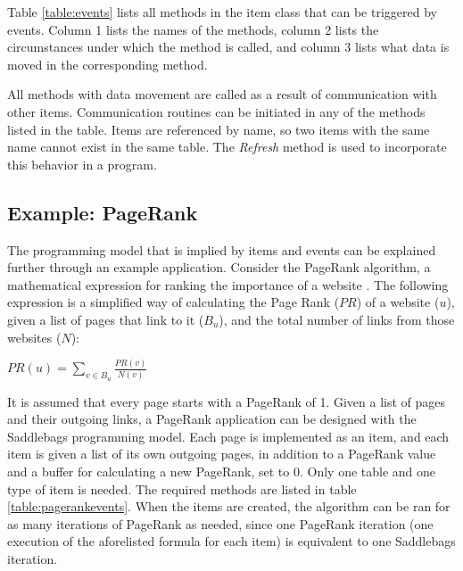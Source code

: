 \documentclass{uit-report}
\begin{document}
Table \ref{table:events} lists all methods in the item class that can be triggered by events. Column 1 lists the names of the methods, column 2 lists the circumstances under which the method is called, and column 3 lists what data is moved in the corresponding method.

All methods with data movement are called as a result of communication with other items. Communication routines can be initiated in any of the methods listed in the table. Items are referenced by name, so two items with the same name cannot exist in the same table. The \emph{Refresh} method is used to incorporate this behavior in a program.
\newpage
\subsection{Example: PageRank} \label{section:examplepagerank}
The programming model that is implied by items and events can be explained further through an example application. Consider the PageRank algorithm, a mathematical expression for ranking the importance of a website \cite{pagerank}. The following expression is a simplified way of calculating the Page Rank ($PR$) of a website ($u$), given a list of pages that link to it ($B_u$), and the total number of links from those websites ($N$):

\vspace{10pt}
\begin{center}
${\displaystyle PR(u)=\sum_{v\in B_{u}}{\frac{PR(v)}{N(v)}}}$

\end{center}
\vspace{20pt}

It is assumed that every page starts with a PageRank of 1. Given a list of pages and their outgoing links, a PageRank application can be designed with the Saddlebags programming model. Each page is implemented as an item, and each item is given a list of its own outgoing pages, in addition to a PageRank value and a buffer for calculating a new PageRank, set to 0. Only one table and one type of item is needed. The required methods are listed in table \ref{table:pagerankevents}. When the items are created, the algorithm can be ran for as many iterations of PageRank as needed, since one PageRank iteration (one execution of the aforelisted formula for each item) is equivalent to one Saddlebags iteration.

\vspace{1.5cm}
\end{document}
